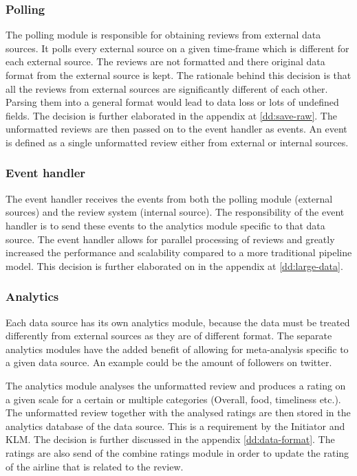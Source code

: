 \subsubsection{Polling}
The polling module is responsible for obtaining reviews from external data sources. It polls every external source on a given time-frame which is different for each external source. The reviews are not formatted and there original data format from the external source is kept. The rationale behind this decision is that all the reviews from external sources are significantly different of each other. Parsing them into a general format would lead to data loss or lots of undefined fields. The decision is further elaborated in the appendix at \ref{dd:save-raw}. The unformatted reviews are then passed on to the event handler as events. An event is defined as a single unformatted review either from external or internal sources.

\subsubsection{Event handler}
The event handler receives the events from both the polling module (external sources) and the review system (internal source). The responsibility of the event handler is to send these events to the analytics module specific to that data source. The event handler allows for parallel processing of reviews and greatly increased the performance and scalability compared to a more traditional pipeline model. This decision is further elaborated on in the appendix at \ref{dd:large-data}.

\subsubsection{Analytics}
Each data source has its own analytics module, because the data must be treated differently from external sources as they are of different format. The separate analytics modules have the added benefit of allowing for meta-analysis specific to a given data source. An example could be the amount of followers on twitter.

The analytics module analyses the unformatted review and produces a rating on a given scale for a certain or multiple categories (Overall, food, timeliness etc.). The unformatted review together with the analysed ratings are then stored in the analytics database of the data source. This is a requirement by the Initiator and KLM. The decision is further discussed in the appendix \ref{dd:data-format}. The ratings are also send of the combine ratings module in order to update the rating of the airline that is related to the review.

